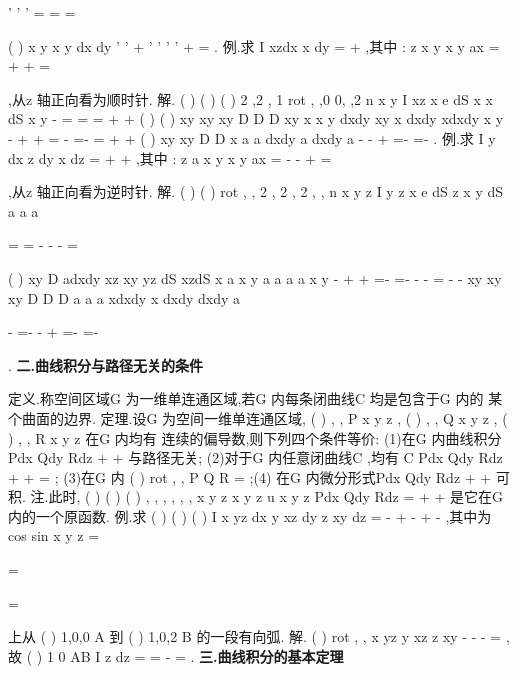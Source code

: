 '
'
'
\cdots 
=
=
\cdots 
=




\int \int 
\int \int 
\int \int 
(
)
x
y
x
y
dx dy
\pi 
'
'
+
\le 
'
'
'
'
+
=
\int \int 
. 
\textcolor{lyred}{例}.求
I
xzdx
x dy
\Gamma 
=
+
\int \nabla 
,其中
:
z
x
y
x
y
ax
=
+
\Gamma 
+
=

,从z 轴正向看为顺时针. 
解.
(
)
(
)
(
)
2 ,2 , 1
rot
,
,0
0, ,2
n
x
y
I
xz x
e dS
x
x
dS
x
y
\Sigma 
\Sigma 
-
=
\cdots 
=
\cdots 
=
+
+
\int \int 
\int \int 
\rho 
(
)
(
)
xy
xy
xy
D
D
D
xy
x
x
y dxdy
xy
x dxdy
xdxdy
x
y
-
+
+
=
-
=-
=
+
+
\int \int 
\int \int 
\int \int 
(
)
xy
xy
D
D
x
a
a dxdy
a
dxdy
a
\pi 
-
-
+
=-
=-
\int \int 
\int \int 
. 
\textcolor{lyred}{例}.求
I
y dx
z dy
x dz
\Gamma 
=
+
+
\int \nabla 
,其中
: z
a
x
y
x
y
ax
=
-
-
\Gamma 
+
=

,从z 轴正向看为逆时针. 
解.
(
)
(
)
rot
,
,
2 , 2 , 2
,
,
n
x y z
I
y
z
x
e dS
z
x
y
dS
a a a
\Sigma 
\Sigma 


=
\cdots 
=
-
-
-
\cdots 
=




\int \int 
\int \int 
\rho 
(
)
xy
D
adxdy
xz
xy
yz dS
xzdS
x a
x
y
a
a
a
a
x
y
\Sigma 
\Sigma 
-
+
+
=-
=-
-
-
\cdots 
=
-
-
\int \int 
\int \int 
\int \int 
xy
xy
xy
D
D
D
a
a
a
xdxdy
x
dxdy
dxdy
a
\pi 


-
=-
-
+
=-
\cdots 
=-




\int \int 
\int \int 
\int \int 
. 
\vspace{4pt}
{\bfseries \textcolor{lyred}{二.曲线积分与路径无关的条件}}

\textcolor{lyred}{定义}.称空间区域G 为\textcolor{lyred}{一维单连通区域},若G 内每条闭曲线C 均是包含于G 内的 
某个曲面的边界. 
\textcolor{lyred}{定理}.设G 为空间一维单连通区域,
(
)
, ,
P x y z ,
(
)
, ,
Q x y z ,
(
)
, ,
R x y z 在G 内均有 
连续的偏导数,则下列四个条件等价: 
(1)在G 内曲线积分Pdx
Qdy
Rdz
\Gamma 
+
+
\int 
与路径无关; 
(2)对于G 内任意闭曲线C ,均有
C
Pdx
Qdy
Rdz
+
+
=
\int \nabla 
; 
(3)在G 内
(
)
rot
,
,
P Q R =
\rho 
;(4) 在G 内微分形式Pdx
Qdy
Rdz
+
+
可积. 
\textcolor{lyred}{注}.此时, (
)
(
)
(
)
, ,
,
,
, ,
x y z
x
y
z
u x y z
Pdx
Qdy
Rdz
=
+
+
\int 
是它在G 内的一个原函数. 
\textcolor{lyred}{例}.求
(
)
(
)
(
)
I
x
yz dx
y
xz dy
z
xy dz
\Gamma 
=
-
+
-
+
-
\int 
,其中\Gamma 为
cos
sin
x
y
z
\varphi 
\varphi 
\varphi 
=


=

=

上从 
(
)
1,0,0
A
到
(
)
1,0,2
B
\pi 的一段有向弧. 
解.
(
)
rot
,
,
x
yz y
xz z
xy
-
-
-
=
,故
\approx 
(
)
1 0
AB
I
z
dz
\pi 
\pi 
=
=
-\cdots 
=
\int 
\int 
. 
\vspace{4pt}
{\bfseries \textcolor{lyred}{三.曲线积分的基本定理}}

